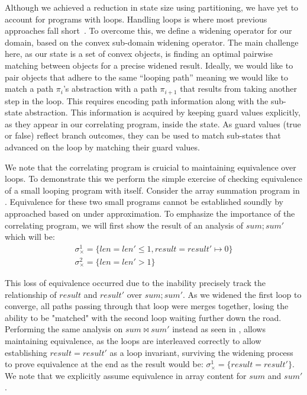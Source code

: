 

Although we achieved a reduction in state size using partitioning, we have yet to account for programs with loops. Handling loops is where most previous approaches fall short~\cite{GodlinStrichman09, KawaguchiLahiriRebelo10, DwyerElbaumPerson08, EnglerRamos11}. To overcome this, we define a widening operator for our domain, based on the convex sub-domain widening operator. The main challenge here, as our state is a set of convex objects, is finding an optimal pairwise matching between objects for a precise widened result. Ideally, we would like to pair objects that adhere to the same ``looping path'' meaning we would like to match a path $\pi_i$'s abstraction with a path $\pi_{i+1}$ that results from taking another step in the loop. This requires encoding path information along with the sub-state abstraction. This information is acquired by keeping guard values explicitly, as they appear in our correlating program, inside the state. As guard values (true or false) reflect branch outcomes, they can be used to match sub-states that advanced on the loop by matching their guard values.



We note that the correlating program is cruicial to maintaining equivalence over loops. To demonstrate this we perform the simple exercise of checking equivalence of a small looping program with itself. Consider the array summation program in . Equivalence for these two small programs cannot be established soundly by approached based on under approximation. To emphasize the importance of the correlating program, we will first show the result of an analysis of $sum;sum'$ which will be:
{\footnotesize
\[
\begin{array}{c}
\sigma_{\times}^1 = \{len = len' \leq 1, result = result' \mapsto 0\} \\
\sigma_{\times}^2 = \{len = len' > 1\}
\end{array}
\]
}


This loss of equivalence occurred due to the inability precisely track the relationship of $result$ and $result'$ over $sum;sum'$. As we widened the first loop to converge, all paths passing through that loop were merges together, losing the ability to be "matched" with the second loop waiting further down the road. Performing the same analysis on $sum \bowtie sum'$ instead as seen in , allows maintaining equivalence, as the loops are interleaved correctly to allow establishing $result = result'$ as a loop invariant, surviving the widening process to prove equivalence at the end as the result would be:
{\footnotesize $\sigma_{\times}^1 = \{result = result'\}$}.
We note that we explicitly assume equivalence in array content for $sum$ and $sum'$.

